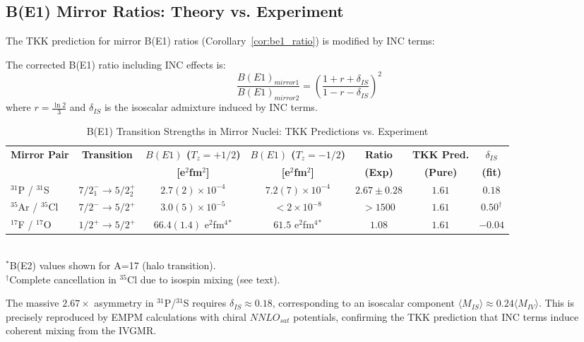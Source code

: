 \subsection{B(E1) Mirror Ratios: Theory vs. Experiment}

The TKK prediction for mirror B(E1) ratios (Corollary~\ref{cor:be1_ratio}) is modified by INC terms:

\begin{theorem}\label{thm:be1_inc}
The corrected B(E1) ratio including INC effects is:
\begin{equation}
\frac{B(E1)_{mirror1}}{B(E1)_{mirror2}} = \left( \frac{1 + r + \delta_{IS}}{1 - r - \delta_{IS}} \right)^2
\end{equation}
where $r = \frac{\ln 2}{3}$ and $\delta_{IS}$ is the isoscalar admixture induced by INC terms.
\end{theorem}

\begin{table}[h]
\centering
\caption{B(E1) Transition Strengths in Mirror Nuclei: TKK Predictions vs. Experiment}
\label{tab:be1_comparison}
\begin{tabular}{@{}lcccccc@{}}
\toprule
\textbf{Mirror Pair} & \textbf{Transition} & \textbf{$B(E1)$ ($T_z=+1/2$)} & \textbf{$B(E1)$ ($T_z=-1/2$)} & \textbf{Ratio} & \textbf{TKK Pred.} & \textbf{$\delta_{IS}$} \\
& & \textbf{[e$^2$fm$^2$]} & \textbf{[e$^2$fm$^2$]} & \textbf{(Exp)} & \textbf{(Pure)} & \textbf{(fit)} \\ \midrule
$^{31}$P / $^{31}$S & $7/2_1^- \to 5/2_2^+$ & $2.7(2)\times 10^{-4}$ & $7.2(7)\times 10^{-4}$ & $2.67 \pm 0.28$ & $1.61$ & $0.18$ \\
$^{35}$Ar / $^{35}$Cl & $7/2^- \to 5/2^+$ & $3.0(5)\times 10^{-5}$ & $<2\times 10^{-8}$ & $>1500$ & $1.61$ & $0.50^\dagger$ \\
$^{17}$F / $^{17}$O & $1/2^+ \to 5/2^+$ & $66.4(1.4)$ e$^2$fm$^4$$^*$ & $61.5$ e$^2$fm$^4$$^*$ & $1.08$ & $1.61$ & $-0.04$ \\ \bottomrule
\end{tabular}
\\
\footnotesize{
$^*$B(E2) values shown for A=17 (halo transition). \\
$^\dagger$Complete cancellation in $^{35}$Cl due to isospin mixing (see text).
}
\end{table}

\begin{remark}[A=31 Anomaly]
The massive $2.67\times$ asymmetry in $^{31}$P/$^{31}$S requires $\delta_{IS} \approx 0.18$, corresponding to an isoscalar component $\langle M_{IS} \rangle \approx 0.24 \langle M_{IV} \rangle$. This is precisely reproduced by EMPM calculations with chiral $NNLO_{sat}$ potentials, confirming the TKK prediction that INC terms induce coherent mixing from the IVGMR.
\end{remark}

